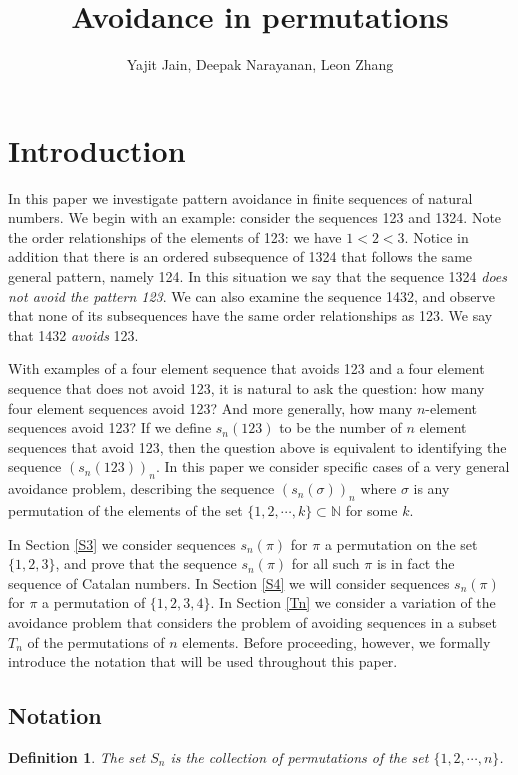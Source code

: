 \documentclass[11pt,letterpaper,twoside,english]{article}
\title{Avoidance in permutations}
\author{Yajit Jain, Deepak Narayanan, Leon Zhang}
\theoremstyle{theorem}
\newtheorem{definition}[theorem]{Definition}
\theoremstyle{remark}
\begin{document}
\maketitle

\section{Introduction}
In this paper we investigate pattern avoidance in finite sequences of natural numbers. We begin with an example: consider the sequences 123 and 1324. Note the order relationships of the elements of 123: we have $1< 2 < 3$. Notice in addition that there is an ordered subsequence of 1324 that follows the same general pattern, namely 124. In this situation we say that the sequence 1324 \emph{does not avoid the pattern 123}. We can also examine the sequence 1432, and observe that none of its subsequences have the same order relationships as 123. We say that 1432 \emph{avoids} 123.

With examples of a four element sequence that avoids 123 and a four element sequence that does not avoid 123, it is natural to ask the question: how many four element sequences avoid 123? And more generally, how many $n$-element sequences avoid 123? If we define $s_n(123)$ to be the number of $n$ element sequences that avoid 123, then the question above is equivalent to identifying the sequence $(s_n(123))_n$. In this paper we consider specific cases of a very general avoidance problem, describing the sequence $(s_n(\sigma))_n$ where $\sigma$ is any permutation of the elements of the set $\{1,2,\cdots, k\}\subset\mathbb{N}$ for some $k$.

In Section \ref{S3} we consider sequences $s_n(\pi)$ for $\pi$ a permutation on the set $\{1,2,3\}$, and prove that the sequence $s_n(\pi)$ for all such $\pi$ is in fact the sequence of Catalan numbers. In Section \ref{S4} we will consider sequences $s_n(\pi)$ for $\pi$ a permutation of $\{1,2,3,4\}$. In Section \ref{Tn} we consider a variation of the avoidance problem that considers the problem of avoiding sequences in a subset $T_n$ of the permutations of $n$ elements. Before proceeding, however, we formally introduce the notation that will be used throughout this paper. 


\subsection{Notation}

\begin{definition}
The set $S_n$ is the collection of permutations of the set $\{1,2,\cdots, n\}$. 
\end{definition}
\end{document}
